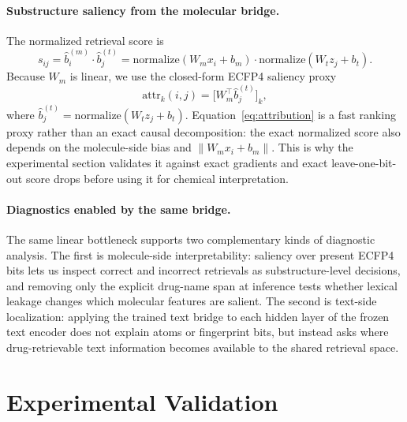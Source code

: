 \documentclass{article}
\begin{document}
\paragraph{Substructure saliency from the molecular bridge.}
The normalized retrieval score is
\begin{equation}
s_{ij}=\hat{b}_i^{(m)}\cdot\hat{b}_j^{(t)}
=\mathrm{normalize}(W_m x_i+b_m)\cdot\mathrm{normalize}(W_t z_j+b_t).
\end{equation}
Because $W_m$ is linear, we use the closed-form ECFP4 saliency proxy
\begin{equation}
\label{eq:attribution}
\mathrm{attr}_k(i,j)=\bigl[W_m^\top\hat{b}_j^{(t)}\bigr]_k,
\end{equation}
where $\hat{b}_j^{(t)}=\mathrm{normalize}(W_tz_j+b_t)$. Equation~\ref{eq:attribution} is a fast ranking proxy rather than an exact causal decomposition: the exact normalized score also depends on the molecule-side bias and $\|W_mx_i+b_m\|$. This is why the experimental section validates it against exact gradients and exact leave-one-bit-out score drops before using it for chemical interpretation.

\paragraph{Diagnostics enabled by the same bridge.}
The same linear bottleneck supports two complementary kinds of diagnostic analysis. The first is molecule-side interpretability: saliency over present ECFP4 bits lets us inspect correct and incorrect retrievals as substructure-level decisions, and removing only the explicit drug-name span at inference tests whether lexical leakage changes which molecular features are salient. The second is text-side localization: applying the trained text bridge to each hidden layer of the frozen text encoder does not explain atoms or fingerprint bits, but instead asks where drug-retrievable text information becomes available to the shared retrieval space.

\section{Experimental Validation}
\label{sec:experiments}
\end{document}
